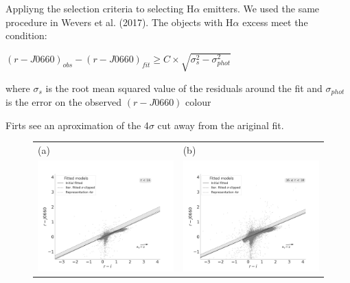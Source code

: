 \documentclass[fleqn,usenatbib]{mnras}
\begin{document}
Appliyng the selection criteria to selecting H$\alpha$ emitters. We used the same procedure in Wevers et al. (2017). The objects with H$\alpha$ excess meet the condition:

 $(r - J0660)_{obs} - (r - J0660)_{fit} \geq C \times \sqrt{\sigma^2_s - \sigma^2_{phot}}$ 
 
where $\sigma_s$ is the root mean squared value of the residuals around
the fit and $\sigma_{phot}$ is the error on the observed $(r - J0660)$ colour

Firts see an aproximation of the  4$\sigma$ cut away from the ariginal fit.

\begin{figure}
  \setlength\tabcolsep{0pt}
  \begin{tabular}{ll}
    (a) & (b) \\
    \includegraphics[trim=10 0 65 20, clip]{Figs/diagram-DR3-errorFlag0-3f-16r}
    & \includegraphics[trim=10 0 65 20, clip]{Figs/diagram-DR3-errorFlag0-3f-16r18}\\

\end{tabular}
\end{figure}
\end{document}
